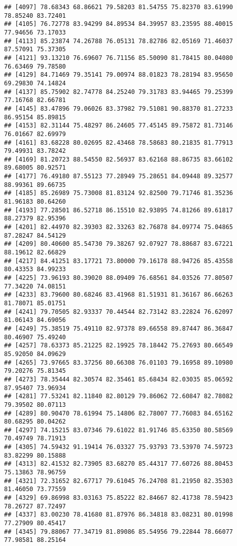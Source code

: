\documentclass[
]{article}
\begin{document}
\begin{verbatim}
## [4097] 78.68343 68.86621 79.58203 81.54755 75.82370 83.61990 78.85240 83.72401
## [4105] 76.72778 83.94299 84.89534 84.39957 83.23595 88.40015 77.94656 73.17033
## [4113] 85.23874 74.26788 76.05131 78.82786 82.05169 71.46037 87.57091 75.37305
## [4121] 93.13210 76.69607 76.71156 85.50090 81.78415 80.04080 76.63469 79.78580
## [4129] 84.71469 79.35141 79.00974 88.01823 78.28194 83.95650 69.29830 74.14824
## [4137] 85.75902 82.74778 84.25240 79.31783 83.94465 79.25399 77.16768 82.66781
## [4145] 83.47896 79.06026 83.37982 79.51081 90.88370 81.27233 86.95154 85.89815
## [4153] 82.31144 75.48297 86.24605 77.45145 89.75872 81.73146 76.01667 82.69979
## [4161] 83.68228 80.02695 82.43468 78.58683 80.21835 81.77913 79.49931 83.78242
## [4169] 81.20723 88.54550 82.56937 83.62168 88.86735 83.66102 89.68005 80.92571
## [4177] 76.49180 87.55123 77.28949 75.28651 84.09448 89.32577 88.99361 89.66735
## [4185] 85.26989 75.73008 81.83124 92.82500 79.71746 81.35236 81.96183 80.64260
## [4193] 77.28501 86.52718 86.15510 82.93895 74.81266 89.61817 88.27379 82.95396
## [4201] 82.44970 82.39303 82.33263 82.76878 84.09774 75.04865 87.28247 84.54129
## [4209] 80.40600 85.54730 79.38267 92.07927 78.88687 83.67221 88.19612 82.66829
## [4217] 84.41251 83.17721 73.80000 79.16178 88.94726 85.43558 80.43353 84.99233
## [4225] 73.96193 80.39020 88.09409 76.68561 84.03526 77.80507 77.34220 74.08151
## [4233] 83.79600 80.68246 83.41968 81.51931 81.36167 86.66263 81.78071 85.01751
## [4241] 79.70505 82.93337 70.44544 82.73142 83.22824 76.62097 81.06143 84.69056
## [4249] 75.38519 75.49110 82.97378 89.66558 89.87447 86.36847 80.46907 75.49240
## [4257] 78.63373 85.21225 82.19925 78.18442 75.27693 80.66549 85.92050 84.09629
## [4265] 73.97665 83.37256 80.66308 76.01103 79.16958 89.10980 79.20276 75.81345
## [4273] 78.35444 82.30574 82.35461 85.68434 82.03035 85.06592 87.95407 73.96934
## [4281] 77.53241 82.11840 82.80129 79.86062 72.60847 82.78082 79.39502 80.07113
## [4289] 80.90470 78.61994 75.14806 82.78007 77.76083 84.65162 80.68295 80.04262
## [4297] 74.15215 83.07346 79.61022 81.91746 85.63350 80.58569 70.49749 78.71913
## [4305] 74.59432 91.19414 76.03327 75.93793 73.53970 74.59723 83.82299 80.15888
## [4313] 82.41532 82.73905 83.68270 85.44317 77.60726 88.80453 75.13863 78.96759
## [4321] 72.31652 82.67717 79.61045 76.24708 81.21950 82.35303 81.46050 73.77559
## [4329] 69.86998 83.03163 75.85222 82.84667 82.41738 78.59423 78.26727 87.72497
## [4337] 83.00230 78.41680 81.87976 86.34818 83.08231 80.01998 77.27909 80.45417
## [4345] 79.88067 77.34719 81.89086 85.54956 79.22844 78.66077 77.98581 88.25164

\end{verbatim}
\end{document}
